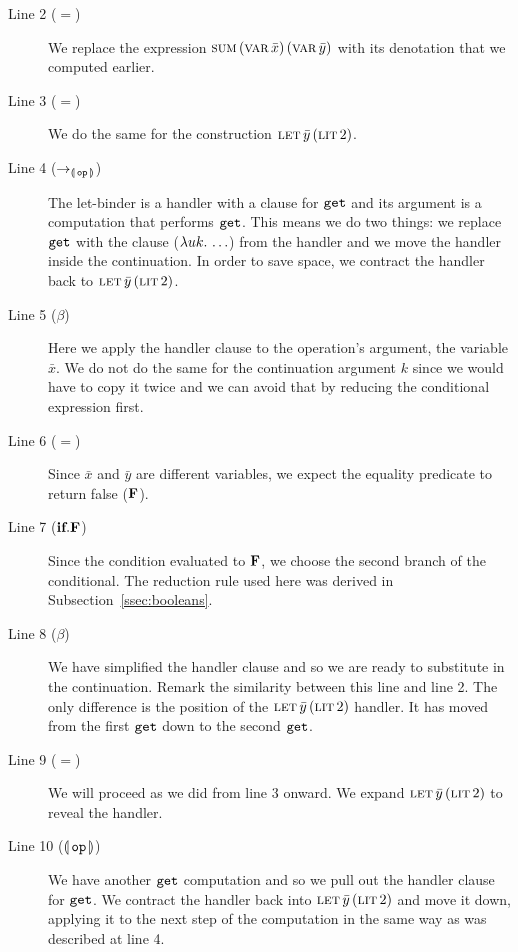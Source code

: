 \begin{description}

  \item[Line 2 ($=$)] We replace the expression
    $\textsc{sum}\,(\textsc{var}\,\bar{x})\,(\textsc{var}\,\bar{y})$ with its denotation that we computed
    earlier.

  \item[Line 3 ($=$)] We do the same for the construction
    $\textsc{let}\,\bar{y}\,(\textsc{lit}\,2)$.

  \item[Line 4 ($\to_{\llparenthesis \, \mathtt{op} \, \rrparenthesis}$)] The let-binder is a handler with
    a clause for $\mathtt{get}$ and its argument is a computation that performs
    $\mathtt{get}$. This means we do two things: we replace $\mathtt{get}$ with the
    clause ($\lambda u k.\, \ldots$) from the handler and we move the handler
    inside the continuation. In order to save space, we contract the
    handler back to $\textsc{let}\,\bar{y}\,(\textsc{lit}\,2)$.

  \item[Line 5 ($\beta$)] Here we apply the handler clause to the
    operation's argument, the variable $\bar{x}$. We do not do the same for
    the continuation argument $k$ since we would have to copy it twice and
    we can avoid that by reducing the conditional expression first.

  \item[Line 6 ($=$)] Since $\bar{x}$ and $\bar{y}$ are different
    variables, we expect the equality predicate to return false ($\textbf{F}$).

  \item[Line 7 ($\textbf{if}.\textbf{F}$)] Since the condition evaluated to
    $\textbf{F}$, we choose the second branch of the conditional. The reduction
    rule used here was derived in Subsection~\ref{ssec:booleans}.

  \item[Line 8 ($\beta$)] We have simplified the handler clause and so
    we are ready to substitute in the continuation. Remark the similarity
    between this line and line 2. The only difference is the position of
    the $\textsc{let}\,\bar{y}\,(\textsc{lit}\,2)$ handler. It has moved from the
    first $\mathtt{get}$ down to the second $\mathtt{get}$.

  \item[Line 9 ($=$)] We will proceed as we did from line 3 onward. We
    expand $\textsc{let}\,\bar{y}\,(\textsc{lit}\,2)$ to reveal the handler.

  \item[Line 10 ($\llparenthesis \, \mathtt{op} \, \rrparenthesis$)] We have another $\mathtt{get}$
    computation and so we pull out the handler clause for $\mathtt{get}$. We
    contract the handler back into $\textsc{let}\,\bar{y}\,(\textsc{lit}\,2)$ and
    move it down, applying it to the next step of the computation in the
    same way as was described at line 4.


\end{description}
